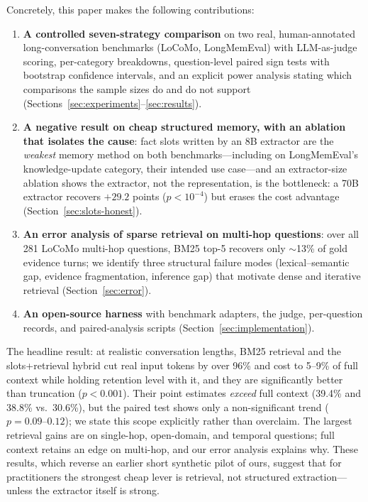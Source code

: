 \documentclass[conference]{IEEEtran}
\begin{document}
Concretely, this paper makes the following contributions:
\begin{enumerate}
    \item \textbf{A controlled seven-strategy comparison} on two real, human-annotated long-conversation benchmarks (LoCoMo, LongMemEval) with LLM-as-judge scoring, per-category breakdowns, question-level paired sign tests with bootstrap confidence intervals, and an explicit power analysis stating which comparisons the sample sizes do and do not support (Sections~\ref{sec:experiments}--\ref{sec:results}).
    \item \textbf{A negative result on cheap structured memory, with an ablation that isolates the cause}: fact slots written by an 8B extractor are the \emph{weakest} memory method on both benchmarks---including on LongMemEval's knowledge-update category, their intended use case---and an extractor-size ablation shows the extractor, not the representation, is the bottleneck: a 70B extractor recovers $+29.2$ points ($p{<}10^{-4}$) but erases the cost advantage (Section~\ref{sec:slots-honest}).
    \item \textbf{An error analysis of sparse retrieval on multi-hop questions}: over all 281 LoCoMo multi-hop questions, BM25 top-5 recovers only $\sim$13\% of gold evidence turns; we identify three structural failure modes (lexical--semantic gap, evidence fragmentation, inference gap) that motivate dense and iterative retrieval (Section~\ref{sec:error}).
    \item \textbf{An open-source harness} with benchmark adapters, the judge, per-question records, and paired-analysis scripts (Section~\ref{sec:implementation}).
\end{enumerate}

The headline result: at realistic conversation lengths, BM25 retrieval and the slots+retrieval hybrid cut real input tokens by over 96\% and cost to 5--9\% of full context while holding retention level with it, and they are significantly better than truncation ($p{<}0.001$). Their point estimates \emph{exceed} full context (39.4\% and 38.8\% vs.\ 30.6\%), but the paired test shows only a non-significant trend ($p{=}0.09$--$0.12$); we state this scope explicitly rather than overclaim. The largest retrieval gains are on single-hop, open-domain, and temporal questions; full context retains an edge on multi-hop, and our error analysis explains why. These results, which reverse an earlier short synthetic pilot of ours, suggest that for practitioners the strongest cheap lever is retrieval, not structured extraction---unless the extractor itself is strong.
\end{document}
